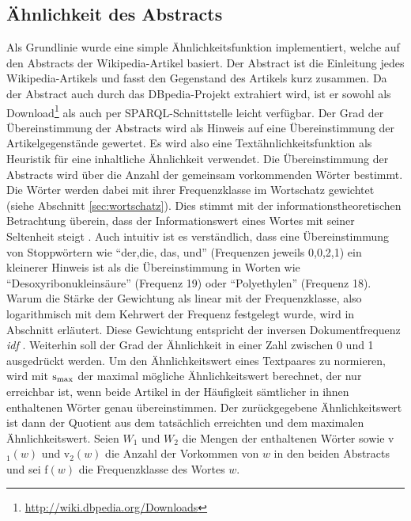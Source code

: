 \subsection{Ähnlichkeit des Abstracts}\label{sec:aehnlichkeitsmass-abstract}
Als Grundlinie wurde eine simple Ähnlichkeitsfunktion implementiert, welche auf den Abstracts der Wikipedia-Artikel basiert.
Der Abstract ist die Einleitung jedes Wikipedia-Artikels und fasst den Gegenstand des Artikels kurz zusammen.
Da der Abstract auch durch das DBpedia-Projekt extrahiert wird, ist er sowohl als Download\footnote{\url{http://wiki.dbpedia.org/Downloads}}
als auch per SPARQL-Schnittstelle leicht verfügbar.
Der Grad der Übereinstimmung der Abstracts wird als Hinweis auf eine Übereinstimmung der Artikelgegenstände gewertet.
Es wird also eine Textähnlichkeitsfunktion als Heuristik für eine inhaltliche Ähnlichkeit verwendet.
Die Übereinstimmung der Abstracts wird über die Anzahl der gemeinsam vorkommenden Wörter bestimmt. Die Wörter werden dabei mit ihrer Frequenzklasse im Wortschatz gewichtet (siehe Abschnitt \ref{sec:wortschatz}).
Dies stimmt mit der informationstheoretischen Betrachtung überein, dass der Informationswert eines Wortes mit seiner Seltenheit steigt \citep[siehe][]{wissensrohstoff_text}.
Auch intuitiv ist es verständlich, dass eine Übereinstimmung von Stoppwörtern wie "`der,die, das, und"' (Frequenzen jeweils 0,0,2,1) ein kleinerer Hinweis ist als die Übereinstimmung 
in Worten wie "`Desoxyribonukleinsäure"' (Frequenz 19) oder "`Polyethylen"' (Frequenz 18).
Warum die Stärke der Gewichtung als linear mit der Frequenzklasse, also logarithmisch mit dem Kehrwert der Frequenz festgelegt wurde, wird in Abschnitt \label{sec:wortschatz} erläutert.
Diese Gewichtung entspricht der inversen Dokumentfrequenz \emph{idf} \citep[siehe][]{modern_information_retrieval}.
Weiterhin soll der Grad der Ähnlichkeit in einer Zahl zwischen 0 und 1 ausgedrückt werden.
Um den Ähnlichkeitswert eines Textpaares zu normieren, wird mit $\textnormal{s}_{\max}$ der maximal mögliche Ähnlichkeitswert berechnet, der nur erreichbar ist, wenn beide Artikel in der Häufigkeit
sämtlicher in ihnen enthaltenen Wörter genau übereinstimmen. Der zurückgegebene Ähnlichkeitswert ist dann der Quotient aus dem tatsächlich erreichten und dem maximalen Ähnlichkeitswert.
Seien $W_1$ und $W_2$ die Mengen der enthaltenen Wörter sowie v$_1(w)$ und v$_2(w)$ die Anzahl der Vorkommen von $w$ in den beiden Abstracts und sei f$(w)$ die Frequenzklasse des Wortes $w$.
